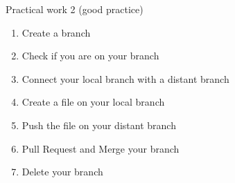 % 

\begin{frame}{Practical work 2 (good practice)}
    \begin{enumerate}
        \item Create a branch
        \item Check if you are on your branch
        \item Connect your local branch with a distant branch
        \item Create a file on your local branch
        \item Push the file on your distant branch
        \item Pull Request and Merge your branch
        \item Delete your branch
    \end{enumerate}
\end{frame}


